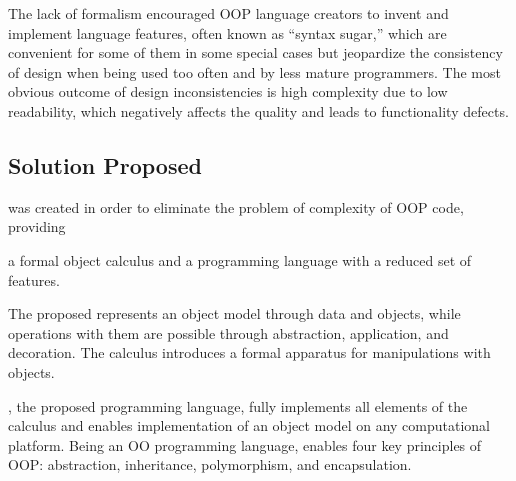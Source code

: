 The lack of formalism encouraged OOP language creators to
invent and implement language features, often known as ``syntax sugar,''
which are convenient for some of them in some special cases but
jeopardize the consistency of design when being used too often
and by less mature programmers. The most obvious
outcome of design inconsistencies is high complexity due to low readability,
which negatively affects the quality and leads to functionality defects.

\subsection{Solution Proposed}

\eo{} was created in order to eliminate the problem of complexity of
OOP code, providing
\begin{inparaenum}[1)]
  a formal object calculus and
  a programming language with a reduced set of features.
\end{inparaenum}
The proposed \phic{} represents an object model through
data and objects, while operations with them are possible
through abstraction, application, and decoration. The calculus
introduces a formal apparatus for manipulations with objects.

\eo{}, the proposed programming language, fully implements
all elements of the calculus and enables implementation of
an object model on any computational platform.
Being an OO programming language, \eo{} enables four key principles of OOP:
abstraction, inheritance, polymorphism, and encapsulation.

